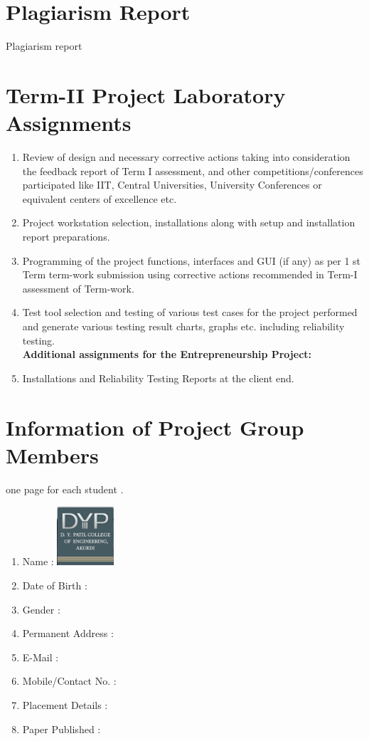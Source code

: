 \documentclass[12pt,a4paper]{article}
\begin{document}
\begin{appendices}
\begin{enumerate}
\end{enumerate}

\section{Plagiarism Report}
Plagiarism report
\section{ Term-II Project Laboratory Assignments}
\begin{enumerate}
\item Review of design and necessary corrective actions taking into consideration the feedback report of Term I assessment, and other competitions/conferences participated like IIT, Central Universities, University Conferences or equivalent centers of excellence etc.
\item Project workstation selection, installations along with setup and installation report preparations.
\item Programming of the project functions, interfaces and GUI (if any) as per 1 st Term term-work submission using corrective actions recommended in Term-I assessment of Term-work.
\item Test tool selection and testing of various test cases for the project performed and generate various testing result charts, graphs etc. including reliability testing.\\
\textbf{Additional assignments for the Entrepreneurship Project:}
\item Installations and Reliability Testing Reports at the client end.

\end{enumerate}
\section{Information of Project Group Members}
one page for each student .
\newpage
\begin{enumerate}
\item Name :  \hspace{90 mm}\includegraphics[width=60pt]{newlogo.png}
\item Date of Birth :
\item Gender : 
\item Permanent Address :
\item E-Mail : 
\item Mobile/Contact No. :
\item Placement Details :
\item Paper Published : 

\end{enumerate}
\end{appendices}
\end{document}
